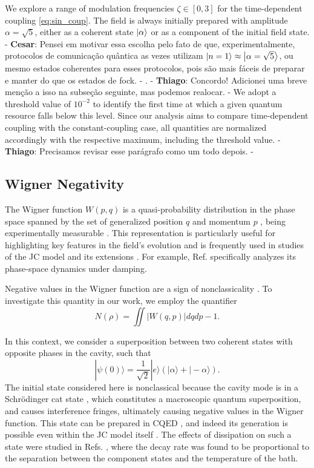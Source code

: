\documentclass[aps,pre,superscriptaddress,twocolumn,10pt]{revtex4-2}
\newcommand{\ts}[1]{{\color{red}- \textbf{Thiago}: #1 - }}
\newcommand{\ca}[1]{{\color{blue}- \textbf{Cesar}: #1 - }}
\begin{document}
We explore a range of modulation frequencies $\zeta \in [0,3]$ for the time-dependent coupling \eqref{eq:sin_coup}. The field is always initially prepared with amplitude $\alpha=\sqrt{5}$, either as a coherent state $\ket{\alpha}$ or as a component of the initial field state. \ca{Pensei em motivar essa escolha pelo fato de que, experimentalmente, protocolos de comunicação quântica as vezes utilizam $\ket{n=1} \approx \ket{\alpha=\sqrt{5}}$, ou mesmo estados coherentes para esses protocolos, pois são mais fáceis de preparar e manter do que os estados de fock.}. 
\ts{Concordo! Adicionei uma breve menção a isso na subseção seguinte, mas podemos realocar.}
We adopt a threshold value of $10^{-2}$ to identify the first time at which a given quantum resource falls below this level. 
Since our analysis aims to compare time-dependent coupling with the constant-coupling case, all quantities are normalized accordingly with the respective maximum, including the threshold value.
\ts{Precisamos revisar esse parágrafo como um todo depois.}

\subsection{Wigner Negativity}
\label{subsec:wigner}
The Wigner function $W(p,q)$ is a quasi-probability distribution in the phase space spanned by the set of generalized position $q$ and momentum $p$ \cite{Wigner1932,Garraway1992}, 
being experimentally measurable \cite{Leibfried2003}.
This representation is particularly useful for highlighting key features in the field's evolution and is frequently used in studies of the JC model and its extensions \cite{Eiselt1991,Larson2007,LARSON2021}.
For example, Ref. \cite{Eiselt1991} specifically analyzes its phase-space dynamics under damping.

Negative values in the Wigner function are a sign of nonclassicality \cite{Anatole_Kenfack_2004,Albarelli2018}. 
To investigate this quantity in our work, we employ the quantifier
\begin{equation}
    N(\rho)= 
\iint\left|W(q, p)\right| d q d p-1.
\end{equation}

In this context, we consider a superposition between two coherent states with opposite phases in the cavity, such that
\begin{equation} \label{eq:init_cat}
    |\psi(0)\rangle=\frac{1}{\sqrt{2}}|e\rangle\left(|\alpha\rangle +|-\alpha\rangle\right).
\end{equation}
The initial state considered here is nonclassical because the cavity mode is in a Schr\"odinger cat state \cite{Schrodinger1935}, which constitutes a macroscopic quantum superposition, and causes interference fringes, ultimately causing negative values in the Wigner function.
This state can be prepared in CQED \cite{Brune1992}, and indeed its generation is possible even within the JC model itself \cite{Auffeves2003}.
The effects of dissipation on such a state were studied in Refs. \cite{Walls1985,Kim1992}, where the decay rate was found to be proportional to the separation between the component states and the temperature of the bath.
\end{document}
